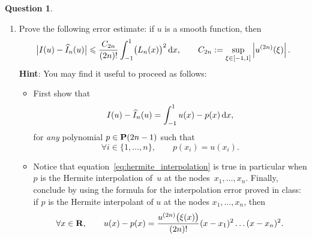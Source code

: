 \documentclass[11pt]{article}
\theoremstyle{definition}
\newtheorem{question}{Question}
\theoremstyle{remark}
\begin{document}
\begin{question}
\begin{enumerate}
                \item
                     Prove the following error estimate:
                    if $u$ is a smooth function,
                    then
                    \[
                         \bigl\lvert I(u) - \widehat I_n(u) \bigr\rvert
                         \leqslant \frac{C_{2n}}{(2n)!}\int_{-1}^1 \bigl(L_n(x)\bigr)^2 \, \mathrm d x,
                         \qquad C_{2n} := \sup_{\xi \in [-1, 1]} \left\lvert u^{(2n)}(\xi) \right\rvert.
                    \]
                    \textbf{Hint}: You may find it useful to proceed as follows:
                    \begin{itemize}
                        \item
                            First show that
                            \begin{equation}
                                \label{eq:hermite_interpolation}
                                 I(u) - \widehat I_n(u)
                                = \int_{-1}^{1} u(x) - p(x) \, \mathrm d x,
                            \end{equation}
                            for \emph{any} polynomial $p \in \mathbf P(2n-1)$ such that
                            \[
                                \forall i \in \{1, \dotsc, n\}, \qquad
                                p(x_i) = u(x_i).
                            \]

                        \item
                            Notice that equation~\eqref{eq:hermite_interpolation} is true in particular when $p$ is the Hermite interpolation of~$u$ at the nodes~$x_1, \dotsc, x_n$.
                            Finally, conclude by using the formula for the interpolation error proved in class:
                            if $p$ is the Hermite interpolant of $u$ at the nodes $x_1, \dotsc, x_n$,
                        then
                        \[
                            \forall x \in \mathbf R, \qquad
                            u(x) - p(x) = \frac{u^{(2n)}\bigl(\xi(x)\bigr)}{(2n)!} (x-x_1)^2 \dotsc (x - x_n)^2.
                        \]
                    \end{itemize}
    \end{enumerate}

\end{question}
\end{document}
